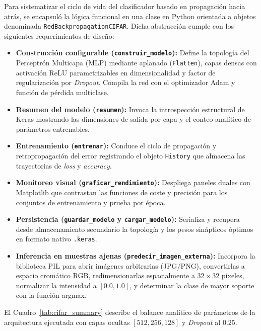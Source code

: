 \documentclass[12pt]{article}
\begin{document}
Para sistematizar el ciclo de vida del clasificador basado en propagación hacia atrás, se encapsuló la lógica funcional en una clase en Python orientada a objetos denominada \texttt{RedBackpropagationCIFAR}. Dicha abstracción cumple con los siguientes requerimientos de diseño:
\begin{itemize}
	\item \textbf{Construcción configurable (\texttt{construir\_modelo}):} Define la topología del Perceptrón Multicapa (MLP) mediante aplanado (\texttt{Flatten}), capas densas con activación ReLU parametrizables en dimensionalidad y factor de regularización por \textit{Dropout}. Compila la red con el optimizador Adam y función de pérdida multiclase.
	\item \textbf{Resumen del modelo (\texttt{resumen}):} Invoca la introspección estructural de Keras mostrando las dimensiones de salida por capa y el conteo analítico de parámetros entrenables.
	\item \textbf{Entrenamiento (\texttt{entrenar}):} Conduce el ciclo de propagación y retropropagación del error registrando el objeto \texttt{History} que almacena las trayectorias de \textit{loss} y \textit{accuracy}.
	\item \textbf{Monitoreo visual (\texttt{graficar\_rendimiento}):} Despliega paneles duales con Matplotlib que contrastan las funciones de coste y precisión para los conjuntos de entrenamiento y prueba por época.
	\item \textbf{Persistencia (\texttt{guardar\_modelo} y \texttt{cargar\_modelo}):} Serializa y recupera desde almacenamiento secundario la topología y los pesos sinápticos óptimos en formato nativo \texttt{.keras}.
	\item \textbf{Inferencia en muestras ajenas (\texttt{predecir\_imagen\_externa}):} Incorpora la biblioteca PIL para abrir imágenes arbitrarias (JPG/PNG), convertirlas a espacio cromático RGB, redimensionarlas espacialmente a $32\times 32$ píxeles, normalizar la intensidad a $[0.0, 1.0]$, y determinar la clase de mayor soporte con la función argmax.
\end{itemize}

El Cuadro~\ref{tab:cifar_summary} describe el balance analítico de parámetros de la arquitectura ejecutada con capas ocultas $[512, 256, 128]$ y \textit{Dropout} al $0.25$.
\end{document}

